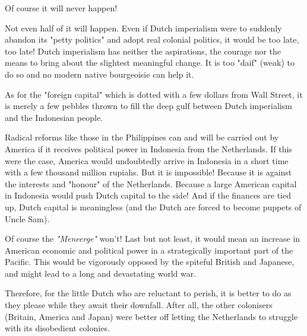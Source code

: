 Of course it will never happen!

Not even half of it will happen. Even if Dutch imperialism were to suddenly abandon its "petty politics" and adopt real colonial politics, 
it would be too late, too late! Dutch imperialism has neither the aspirations, the courage nor the means to bring about the
slightest meaningful change. It is too "daif" (weak) to do so and no modern native bourgeoisie can help it.\nline

As for the "foreign capital" which is dotted with a few dollars from Wall Street, 
it is merely a few pebbles thrown to fill the deep gulf between Dutch imperialism and the Indonesian people.\nline

Radical reforms like those in the Philippines can and will be carried out by America if it 
receives political power in Indonesia from the Netherlands. If this were the case, America would 
undoubtedly arrive in Indonesia in a short time with a few thousand million rupiahs. But it is 
impossible! Because it is against the interests and "honour" of the Netherlands. Because a large 
American capital in Indonesia would push Dutch capital to the side! And if the finances are tied up, 
Dutch capital is meaningless (and the Dutch are forced to become puppets of Uncle Sam).\nline

Of course the \emph{"Meneerge"} won't! Last but not least, it would mean an increase in American economic and political power 
in a strategically important part of the Pacific. This would be vigorously opposed by the spiteful British and Japanese, 
and might lead to a long and devastating world war.\nline

Therefore, for the little Dutch who are reluctant to perish, it is better to do as they please while they await their downfall. 
After all, the other colonisers (Britain, America and Japan) were better off letting the Netherlands to struggle 
with its disobedient colonies.\nline

